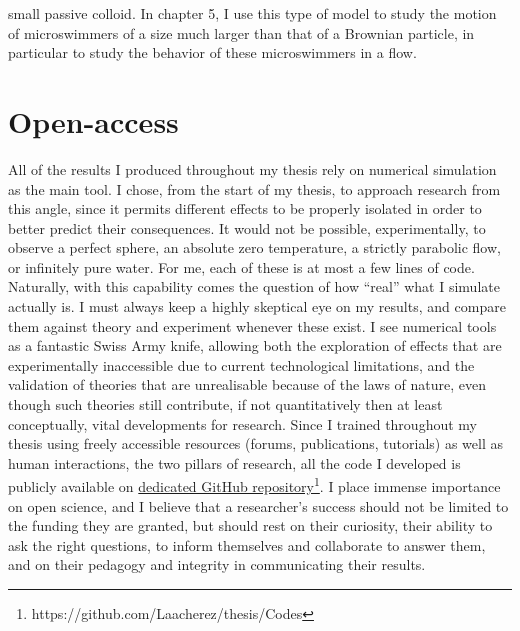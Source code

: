 small passive colloid. In chapter 5, I use this type of model to study the motion of microswimmers of a size much larger than that of a Brownian particle, in particular to study the behavior of these microswimmers in a flow.


\section*{Open-access}
All of the results I produced throughout my thesis rely on numerical simulation as the main tool. I chose, from the start of my thesis, to approach research from this angle, since it permits different effects to be properly isolated in order to better predict their consequences. It would not be possible, experimentally, to observe a perfect sphere, an absolute zero temperature, a strictly parabolic flow, or infinitely pure water. For me, each of these is at most a few lines of code. Naturally, with this capability comes the question of how ``real'' what I simulate actually is. I must always keep a highly skeptical eye on my results, and compare them against theory and experiment whenever these exist. I see numerical tools as a fantastic Swiss Army knife, allowing both the exploration of effects that are experimentally inaccessible due to current technological limitations, and the validation of theories that are unrealisable because of the laws of nature, even though such theories still contribute, if not quantitatively then at least conceptually, vital developments for research.
Since I trained throughout my thesis using freely accessible resources (forums, publications, tutorials) as well as human interactions, the two pillars of research, all the code I developed is publicly available on \href{https://github.com/Laacherez/thesis}{dedicated GitHub repository}\footnote{https://github.com/Laacherez/thesis/Codes}. I place immense importance on open science, and I believe that a researcher's success should not be limited to the funding they are granted, but should rest on their curiosity, their ability to ask the right questions, to inform themselves and collaborate to answer them, and on their pedagogy and integrity in communicating their results.